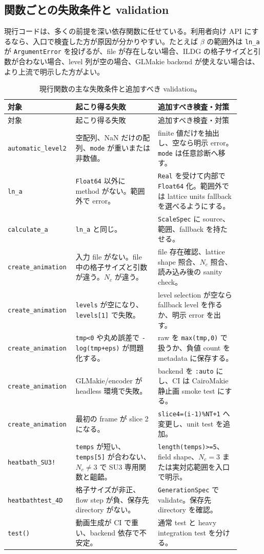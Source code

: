 \documentclass[uplatex,dvipdfmx,ja=standard,11pt,a4paper]{bxjsarticle}
\newcommand{\code}[1]{\texttt{#1}}
\begin{document}
\subsection{関数ごとの失敗条件と validation}
現行コードは、多くの前提を深い依存関数に任せている。利用者向け API にするなら、入口で検査した方が原因が分かりやすい。たとえば \(\beta\) の範囲外は \code{ln\_a} が \code{ArgumentError} を投げるが、file が存在しない場合、ILDG の格子サイズと引数が合わない場合、level 列が空の場合、GLMakie backend が使えない場合は、より上流で明示した方がよい。

{\small
\begin{longtable}{p{0.22\linewidth}p{0.34\linewidth}p{0.34\linewidth}}
\caption{現行関数の主な失敗条件と追加すべき validation。}\label{tab:failure-modes}\\
\toprule
対象 & 起こり得る失敗 & 追加すべき検査・対策 \\
\midrule
\endfirsthead
\toprule
対象 & 起こり得る失敗 & 追加すべき検査・対策 \\
\midrule
\endhead
\code{automatic\_level2} & 空配列、NaN だけの配列、\code{mode} が重いまたは非数値。 & finite 値だけを抽出し、空なら明示 error。\code{mode} は任意診断へ移す。 \\
\code{ln\_a} & \code{Float64} 以外に method がない。範囲外で error。 & \code{Real} を受けて内部で \code{Float64} 化。範囲外では lattice units fallback を選べるようにする。 \\
\code{calculate\_a} & \code{ln\_a} と同じ。 & \code{ScaleSpec} に source、範囲、fallback を持たせる。 \\
\code{create\_animation} & 入力 file がない。file 中の格子サイズと引数が違う。\(N_c\) が違う。 & file 存在確認、lattice shape 照合、\(N_c\) 照合、読み込み後の sanity check。 \\
\code{create\_animation} & \code{levels} が空になり、\code{levels[1]} で失敗。 & level selection が空なら fallback level を作るか、明示 error を出す。 \\
\code{create\_animation} & \code{tmp<0} や丸め誤差で \code{-log(tmp+eps)} が問題化する。 & raw を \code{max(tmp,0)} で扱うか、負値 count を metadata に保存する。 \\
\code{create\_animation} & GLMakie/encoder が headless 環境で失敗。 & backend を \code{:auto} にし、CI は CairoMakie 静止画 smoke test にする。 \\
\code{create\_animation} & 最初の frame が slice 2 になる。 & \code{slice4=(i-1)\%NT+1} へ変更し、unit test を追加。 \\
\code{heatbath\_SU3!} & \code{temps} が短い、\code{temps[5]} が合わない、\(N_c\ne3\) で SU3 専用関数と齟齬。 & \code{length(temps)>=5}、field shape、\(N_c=3\) または実対応範囲を入口で明示。 \\
\code{heatbathtest\_4D} & 格子サイズが非正、flow step が負、保存先 directory がない。 & \code{GenerationSpec} で validate。保存先 directory を確認。 \\
\code{test()} & 動画生成が CI で重い、backend 依存で不安定。 & 通常 test と heavy integration test を分ける。 \\
\bottomrule
\end{longtable}
}
\end{document}

